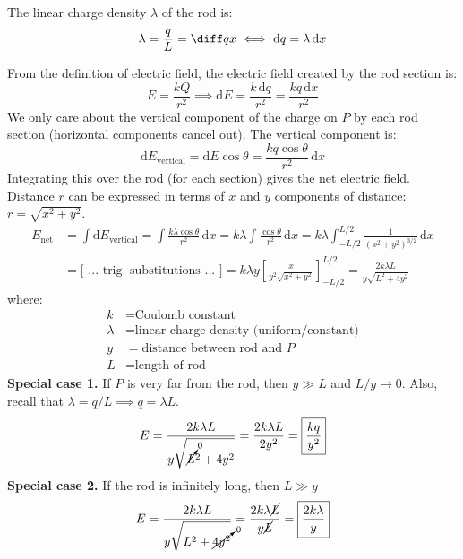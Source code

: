 \documentclass{article}
\newcommand{\defitheorem}[2]{\begin{tcolorbox}[title={#1},colback=violet!5!white,colframe=violet!75!black,parbox=false] #2 \end{tcolorbox}}
\begin{document}
\defitheorem{Linear charge density}{
	The linear charge density $\lambda$ of the rod is:
	\begin{equation*}
	    \lambda=\frac qL=\diff qx
		\iff
		\mathrm{d}q=\lambda \,\mathrm{d}x
	\end{equation*}
}
From the definition of electric field, the electric field created by the rod section is:
\begin{equation*}
    E=\frac{kQ}{r^2}
	\implies
	\mathrm{d}E=\frac{k \,\mathrm{d}q}{r^2}=\frac{kq \,\mathrm{d}x}{r^2}
\end{equation*}
We only care about the vertical component of the charge on $P$ by each rod section (horizontal components cancel out). The vertical component is:
\begin{equation*}
	\mathrm{d}E_\text{vertical}
	=\mathrm{d}E\cos\theta
	=\frac{kq \cos\theta}{r^2}\,\mathrm{d}x
\end{equation*}
Integrating this over the rod (for each section) gives the net electric field. Distance $r$ can be expressed in terms of $x$ and $y$ components of distance: $r=\sqrt{x^2+y^2}$.
\begin{align*}
	E_\text{net}
	&=\int \mathrm{d}E_\text{vertical}
	=\int \frac{k\lambda\cos\theta}{r^2}\,\mathrm{d}x
	=k\lambda \int \frac{\cos\theta}{r^2}\,\mathrm{d}x
	=k\lambda \int_{-L/2}^{L/2}\frac{1}{(x^2+y^2)^{3/2}}\,\mathrm{d}x \\
	&=\Big[ \text{ ... trig. substitutions ... } \Big]
	=k\lambda y \left[\frac{x}{y^2 \sqrt{x^2+y^2}}\right]_{-L/2}^{L/2}
	=\boxed{\frac{2k\lambda L}{y\sqrt{L^2+4y^2}}}
\end{align*}
where:
\begin{align*}
	k&=\text{Coulomb constant} \\
	\lambda&=\text{linear charge density (uniform/constant)} \\
	y&=\text{distance between rod and $P$} \\
	L&=\text{length of rod}
\end{align*}
\textbf{Special case 1.} If $P$ is very far from the rod, then $y\gg L$ and $L/y\to 0$. Also, recall that $\lambda=q/L \implies q=\lambda L$.
\begin{equation*}
    E
	=\frac{2k\lambda L}{y \sqrt{\cancelto0L^2+4y^2}}
	=\frac{2k\lambda L}{2y^2}
	=\boxed{\frac{kq}{y^2}}
\end{equation*}
\textbf{Special case 2.} If the rod is infinitely long, then $L\gg y$
\begin{equation*}
	E
	=\frac{2k\lambda L}{y \sqrt{L^2+\cancelto0{4y^2}}}
	=\frac{2k\lambda \cancel L}{y\cancel L}
	=\boxed{\frac{2k\lambda}{y}}
\end{equation*}
\end{document}
